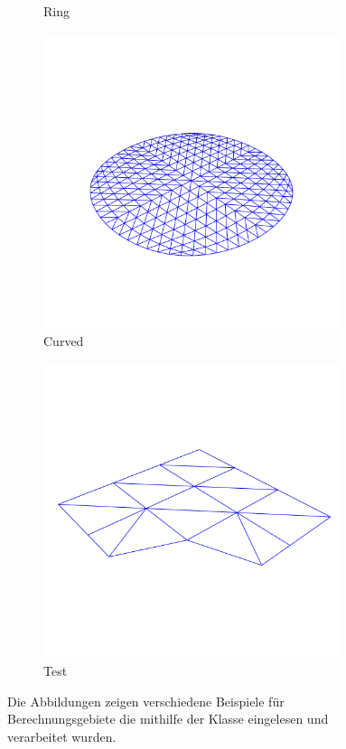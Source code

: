 \documentclass[crop=false,10pt,ngerman]{standalone}
\begin{document}
\begin{figure}
\begin{subfigure}[b]{0.24\textwidth}
          \caption{Ring}
        \end{subfigure}
        \begin{subfigure}[b]{0.24\textwidth}
          \center
          \includegraphics[trim={0 0 0 2cm},clip,width=0.95\textwidth]{images/model-circle-0.png}
          \caption{Curved}
        \end{subfigure}
        \begin{subfigure}[b]{0.24\textwidth}
          \center
          \includegraphics[trim={0 0 0 2cm},clip,width=0.95\textwidth]{images/model-test-0.png}
          \caption{Test}
        \end{subfigure}
        \caption[Beispiele verschiedener Berechnungsgebiete]{%
          Die Abbildungen zeigen verschiedene Beispiele für Berechnungsgebiete die mithilfe der Klasse  eingelesen und verarbeitet wurden.
        }
        \label{fig:model-examples}
      \end{figure}
\end{document}
